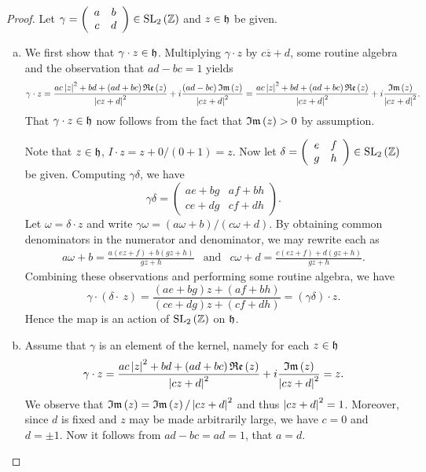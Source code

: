 \documentclass[10pt]{amsart}
\begin{document}
\begin{thm}
  \begin{proof}
	Let $\gamma = \left(\begin{array}{cc} a & b\\c & d\end{array}\right) \in \operatorname{SL}_2\left(\mathbb{Z}\right)$ and $z \in \mathfrak{h}$ be given.
    \begin{enumerate}[(a)]
		\item
			We first show that $\gamma \cdot z \in \mathfrak{h}$.
			Multiplying $\gamma\cdot z$ by $c\overline{z} + d$, some routine algebra and the observation that $ad-bc = 1$ yields
			$$\gamma\cdot z = \frac{ac\left| z \right|^2 + bd + (ad + bc)\operatorname{\mathfrak{Re}}\left(z\right)}{\left| cz+d \right|^2} + i\frac{(ad - bc)\operatorname{\mathfrak{Im}}\left(z\right)}{\left| cz+d \right|^2} = \frac{ac\left| z \right|^2 + bd + (ad + bc)\operatorname{\mathfrak{Re}}\left(z\right)}{\left| cz+d \right|^2} + i\frac{\operatorname{\mathfrak{Im}}\left(z\right)}{\left| cz+d \right|^2}.$$
			That $\gamma\cdot z \in \mathfrak{h}$ now follows from the fact that $\operatorname{\mathfrak{Im}}\left(z\right) > 0$ by assumption.
			
			Note that $z \in \mathfrak{h}$, $I\cdot z = z + 0 / (0 + 1) = z$.
			Now let $\delta = \left(\begin{array}{cc} e & f\\g & h\end{array}\right) \in \operatorname{SL}_2\left(\mathbb{Z}\right)$ be given.			
			Computing $\gamma\delta$, we have $$\gamma\delta = \left(\begin{array}{cc} ae + bg & af + bh\\ce + dg & cf + dh\end{array}\right).$$
			Let $\omega = \delta\cdot z$ and write $\gamma\omega = (a\omega + b)/(c\omega + d)$.
			By obtaining common denominators in the numerator and denominator, we may rewrite each as
			$$\begin{array}{lcr}
				a\omega + b = \displaystyle{\frac{a(ez + f) + b(gz+h)}{gz+h}} &\text{and}& c\omega + d = \displaystyle{\frac{c(ez + f) + d(gz+h)}{gz+h}}.
			\end{array}$$
			Combining these observations and performing some routine algebra, we have $$\gamma\cdot(\delta\cdot\ z) = \frac{(ae + bg)z + (af + bh)}{(ce + dg)z + (cf + dh)} = (\gamma\delta)\cdot z.$$
			Hence the map is an action of $\operatorname{SL}_2\left(\mathbb{Z}\right)$ on $\mathfrak{h}$.
		\item
			Assume that $\gamma$ is an element of the kernel, namely for each $z \in \mathfrak{h}$
			\begin{equation}\label{kernel}
				\gamma\cdot z = \frac{ac\left| z \right|^2 + bd + (ad + bc)\operatorname{\mathfrak{Re}}\left(z\right)}{\left| cz+d \right|^2} + i\frac{\operatorname{\mathfrak{Im}}\left(z\right)}{\left| cz+d \right|^2} = z.
			\end{equation}
			We observe that $\operatorname{\mathfrak{Im}}\left(z\right) = \operatorname{\mathfrak{Im}}\left(z\right)/\left| cz + d \right|^2$ and thus $\left| cz + d \right|^2 = 1$.
			Moreover, since $d$ is fixed and $z$ may be made arbitrarily large, we have $c = 0$ and $d = \pm1$.
			Now it follows from $ad - bc = ad = 1$, that $a = d$.
			

\end{enumerate}
\end{proof}
\end{thm}
\end{document}
